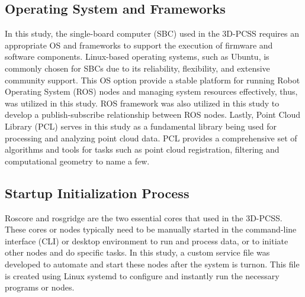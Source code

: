 \subsection{Operating System and Frameworks}

In this study, the single-board computer (SBC) used in the 3D-PCSS requires an appropriate OS and frameworks to support the execution of firmware and software components. Linux-based operating systems, such as Ubuntu, is commonly chosen for SBCs due to its reliability, flexibility, and extensive community support. This OS option provide a stable platform for running Robot Operating System (ROS) nodes and managing system resources effectively, thus, was utilized in this study. ROS framework was also utilized in this study to develop a publish-subscribe relationship between ROS nodes. Lastly, Point Cloud Library (PCL) serves in this study as a fundamental library being used for processing and analyzing point cloud data. PCL provides a comprehensive set of algorithms and tools for tasks such as point cloud registration, filtering and computational geometry to name a few.

\subsection{Startup Initialization Process}
Roscore and rosgridge are the two essential cores that used in the 3D-PCSS. These cores or nodes typically need to be manually started in the command-line interface (CLI) or desktop environment to run and process data, or to initiate other nodes and do specific tasks. In this study, a custom service file was developed to automate and start these nodes after the system is turnon. This file is created using Linux systemd to configure and instantly run the necessary programs or nodes.



